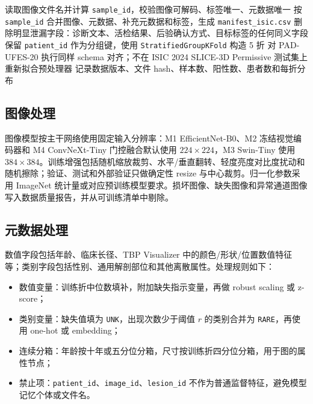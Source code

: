 \documentclass[UTF8,a4paper,10pt,twocolumn,fontset=fandol]{ctexart}
\newcommand{\isic}{ISIC 2024 SLICE-3D Permissive}
\newcommand{\pad}{PAD-UFES-20}
\begin{document}
\begin{algorithm}[t]
\small
\caption{可复现数据处理流程}
\label{alg:data_pipeline}
读取图像文件名并计算 \texttt{sample\_id}，校验图像可解码、标签唯一、元数据唯一\;
按 \texttt{sample\_id} 合并图像、元数据、补充元数据和标签，生成 \texttt{manifest\_isic.csv}\;
删除明显泄漏字段：诊断文本、活检结果、后验确认方式、目标标签的任何同义字段\;
保留 \texttt{patient\_id} 作为分组键，使用 \texttt{StratifiedGroupKFold} 构造 5 折\;
对 \pad{} 执行同样 schema 对齐；不在 \isic{} 测试集上重新拟合预处理器\;
记录数据版本、文件 hash、样本数、阳性数、患者数和每折分布\;
\end{algorithm}

\subsection{图像处理}
图像模型按主干网络使用固定输入分辨率：M1 EfficientNet-B0、M2 冻结视觉编码器和 M4 ConvNeXt-Tiny 门控融合默认使用 $224\times224$，M3 Swin-Tiny 使用 $384\times384$。训练增强包括随机缩放裁剪、水平/垂直翻转、轻度亮度对比度扰动和随机擦除；验证、测试和外部验证只做确定性 resize 与中心裁剪。归一化参数采用 ImageNet 统计量或对应预训练模型要求。损坏图像、缺失图像和异常通道图像写入数据质量报告，并从可训练清单中剔除。

\subsection{元数据处理}
数值字段包括年龄、临床长径、TBP Visualizer 中的颜色/形状/位置数值特征等；类别字段包括性别、通用解剖部位和其他离散属性。处理规则如下：
\begin{itemize}
    \item 数值变量：训练折中位数填补，附加缺失指示变量，再做 robust scaling 或 z-score；
    \item 类别变量：缺失值填为 \texttt{UNK}，出现次数少于阈值 $r$ 的类别合并为 \texttt{RARE}，再使用 one-hot 或 embedding；
    \item 连续分箱：年龄按十年或五分位分箱，尺寸按训练折四分位分箱，用于图的属性节点；
    \item 禁止项：\texttt{patient\_id}、\texttt{image\_id}、\texttt{lesion\_id} 不作为普通监督特征，避免模型记忆个体或文件名。
\end{itemize}
\end{document}
